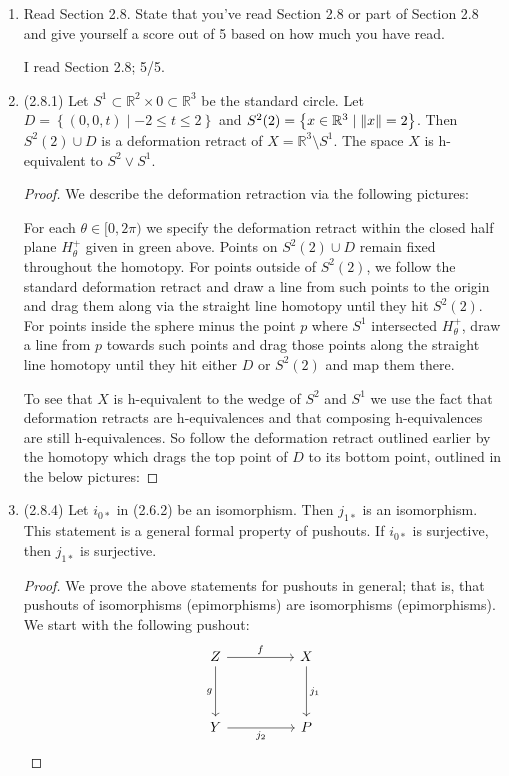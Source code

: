 \documentclass[11pt]{article}
\newcommand{\cbr}[1]{\left\{#1\right\}}
\begin{document}
\begin{enumerate}
    \item Read Section 2.8. State that you've read Section 2.8 or part of Section 2.8 and give yourself a score out of 5 based on how much you have read.
    
    I read Section 2.8; 5/5.
    \item (2.8.1) Let $S^1\subset \mathbb{R}^2\times 0\subset \mathbb{R}^3$ be the standard circle. Let $D = \cbr{(0,0,t)\mid -2\leq t\leq 2}$ and $S^2(2) = \cbr{x\in\mathbb{R}^3\mid \norm{x} = 2}$. Then $S^2(2)\cup D$ is a deformation retract of $X = \mathbb{R}^3\setminus S^1$. The space $X$ is h-equivalent to $S^2\vee S^1$. \begin{proof}
      We describe the deformation retraction via the following pictures: \vspace*{5cm}

      For each $\theta\in [0,2\pi)$ we specify the deformation retract within the closed half plane $H^+_\theta$ given in green above. Points on $S^2(2)\cup D$ remain fixed throughout the homotopy. For points outside of $S^2(2)$, we follow the standard deformation retract and draw a line from such points to the origin and drag them along via the straight line homotopy until they hit $S^2(2)$. For points inside the sphere minus the point $p$ where $S^1$ intersected $H^+_\theta$, draw a line from $p$ towards such points and drag those points along the straight line homotopy until they hit either $D$ or $S^2(2)$ and map them there.

      To see that $X$ is h-equivalent to the wedge of $S^2$ and $S^1$ we use the fact that deformation retracts are h-equivalences and that composing h-equivalences are still h-equivalences. So follow the deformation retract outlined earlier by the homotopy which drags the top point of $D$ to its bottom point, outlined in the below pictures: \vspace*{5cm}
    \end{proof}
    \item (2.8.4) Let $i_{0\ast}$ in (2.6.2) be an isomorphism. Then $j_{1\ast}$ is an isomorphism. This statement is a
    general formal property of pushouts. If $i_{0\ast}$ is surjective, then $j_{1\ast}$ is surjective. \begin{proof} We prove the above statements for pushouts in general; that is, that pushouts of isomorphisms (epimorphisms) are isomorphisms (epimorphisms). We start with the following pushout: %
      \[\begin{tikzcd}
        Z && X \\
        \\
        Y && P
        \arrow["f", from=1-1, to=1-3]
        \arrow["g"', from=1-1, to=3-1]
        \arrow["{j_2}"', from=3-1, to=3-3]
        \arrow["{j_1}", from=1-3, to=3-3]
      \end{tikzcd}\]


\end{proof}
\end{enumerate}
\end{document}
